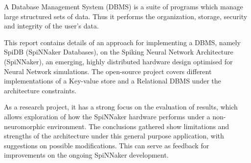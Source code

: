 { \par}
\vspace{5mm}
A Database Management System (DBMS) is a suite of programs which manage large structured sets of data.\cite{dbmsdef} Thus it performs the organization, storage, security and integrity of the user's data.

This report contains details of an approach for implementing a DBMS, namely SpiDB (SpiNNaker Databases), on the Spiking Neural Network Architecture (SpiNNaker), an emerging, highly distributed hardware design optimised for Neural Network simulations. The open-source project covers different implementations of a Key-value store and a Relational DBMS under the architecture constraints.

As a research project, it has a strong focus on the evaluation of results, which allows exploration of how the SpiNNaker hardware performs under a non-neuromorphic environment. The conclusions gathered show limitations and strengths of the architecture under this general purpose application, with suggestions on possible modifications. This can serve as feedback for improvements on the ongoing SpiNNaker development.
